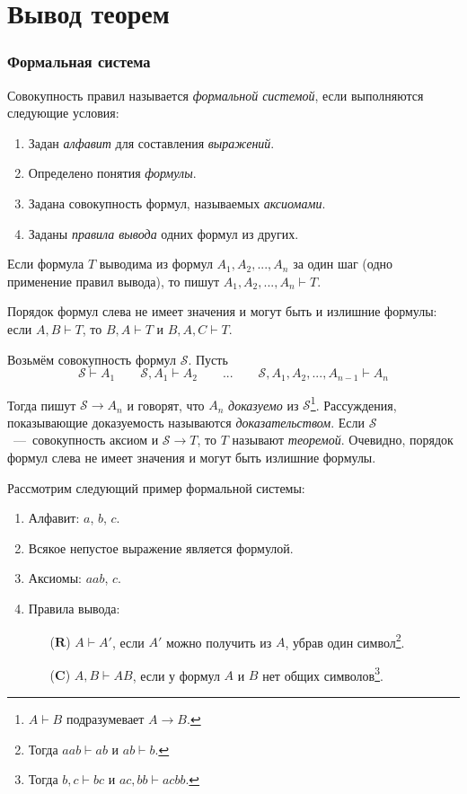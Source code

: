 \part{Вывод теорем}

\section{Формальная система}

Совокупность правил называется {\it формальной системой}, если выполняются следующие
условия:
\begin{enumerate}
	\item{}Задан {\it алфавит} для составления {\it выражений}.
	\item{}Определено понятия {\it формулы}.
	\item{}Задана совокупность формул, называемых {\it аксиомами}.
	\item{}Заданы {\it правила вывода} одних формул из других.
\end{enumerate}

Если формула $T$ выводима из формул $A_1,A_2,...,A_{n}$ за один шаг (одно применение
правил вывода), то пишут $A_1,A_2,...,A_{n}\vdash T$.

Порядок формул слева не имеет значения и могут быть и излишние формулы:
если $A,B\vdash T$, то $B,A\vdash T$ и $B,A,C\vdash T$.

\newcommand\Sx{\mathcal S}
Возьмём совокупность формул $\Sx$. Пусть
\[
	\Sx\vdash A_1\qquad
	\Sx,A_1\vdash A_2\qquad...\qquad
	\Sx,A_1,A_2,...,A_{n-1}\vdash A_{n}
\]

Тогда пишут $\Sx\to A_{n}$ и говорят, что $A_{n}$ {\it доказуемо} из $\Sx$\footnote{
	$A\vdash B$ подразумевает $A\to B$.
}.
Рассуждения, показывающие доказуемость называются {\it доказательством}.
Если $\Sx$~---~совокупность аксиом и $\Sx\to T$, то $T$ называют
{\it теоремой}. Очевидно, порядок формул слева не имеет значения и могут быть
излишние формулы.

\newcommand\ruleR{\mathbf{R}}
\newcommand\ruleC{\mathbf{C}}

Рассмотрим следующий пример формальной системы:
\begin{enumerate}
	\item{}Алфавит: $a$, $b$, $c$.
	\item{}Всякое непустое выражение является формулой.
	\item{}Аксиомы: $aab$, $c$.
	\item{}Правила вывода:
	\begin{enumerate}
		\item[($\ruleR$)]{}$A\vdash A'$, если $A'$ можно получить из $A$,
		убрав один символ\footnote{Тогда $aab\vdash ab$ и $ab\vdash b$.}.
		\item[($\ruleC$)]{}$A,B\vdash AB$, если у формул $A$ и $B$ нет
		общих символов\footnote{Тогда $b,c\vdash bc$ и $ac,bb\vdash acbb$.}.
	\end{enumerate}
\end{enumerate}

